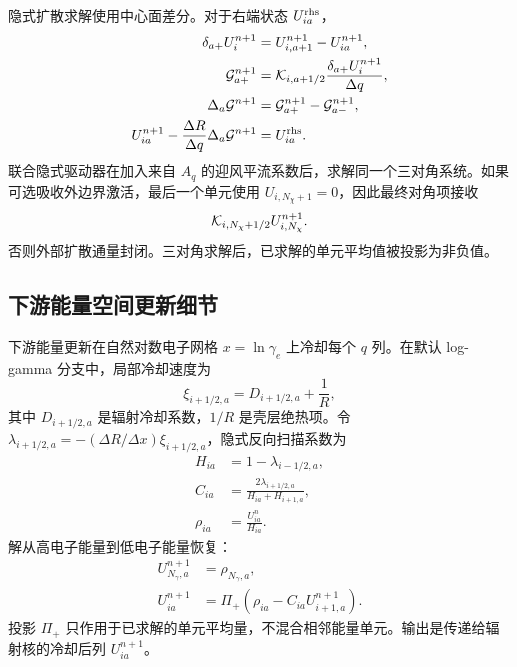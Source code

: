 \documentclass[twocolumn]{aastex702}
\begin{document}
隐式扩散求解使用中心面差分。对于右端状态 \(U_{ia}^{\rm rhs}\)，
\begin{equation}
\begin{aligned}
\delta_{a+}U_i^{n+1}
&=U_{i,a+1}^{n+1}-U_{ia}^{n+1},\\
{\cal G}_{a+}^{n+1}
&={\cal K}_{i,a+1/2}
\frac{\delta_{a+}U_i^{n+1}}{\Delta q},\\
\Delta_a{\cal G}^{n+1}
&={\cal G}_{a+}^{n+1}-{\cal G}_{a-}^{n+1},\\
U_{ia}^{n+1}
-\frac{\Delta R}{\Delta q}\Delta_a{\cal G}^{n+1}
&=U_{ia}^{\rm rhs}.
\end{aligned}
\end{equation}
联合隐式驱动器在加入来自 \(A_q\) 的迎风平流系数后，求解同一个三对角系统。如果可选吸收外边界激活，最后一个单元使用 \(U_{i,N_\chi+1}=0\)，因此最终对角项接收
\begin{equation}
{\cal K}_{i,N_\chi+1/2}U_{i,N_\chi}^{n+1}.
\end{equation}
否则外部扩散通量封闭。三对角求解后，已求解的单元平均值被投影为非负值。

\subsection{下游能量空间更新细节}

下游能量更新在自然对数电子网格 \(x=\ln\gamma_e\) 上冷却每个 \(q\) 列。在默认 log-gamma 分支中，局部冷却速度为
\begin{equation}
\xi_{i+1/2,a}=D_{i+1/2,a}+\frac{1}{R},
\end{equation}
其中 \(D_{i+1/2,a}\) 是辐射冷却系数，\(1/R\) 是壳层绝热项。令 \(\lambda_{i+1/2,a}=-(\Delta R/\Delta x)\xi_{i+1/2,a}\)，隐式反向扫描系数为
\begin{equation}
\begin{aligned}
H_{ia}&=1-\lambda_{i-1/2,a},\\
C_{ia}&=\frac{2\lambda_{i+1/2,a}}{H_{ia}+H_{i+1,a}},\\
\rho_{ia}&=\frac{U_{ia}^{n}}{H_{ia}} .
\end{aligned}
\end{equation}
解从高电子能量到低电子能量恢复：
\begin{equation}
\begin{aligned}
U_{N_\gamma,a}^{n+1}&=\rho_{N_\gamma,a},\\
U_{ia}^{n+1}
&=\Pi_+\!\left(\rho_{ia}-C_{ia}U_{i+1,a}^{n+1}\right).
\end{aligned}
\end{equation}
投影 \(\Pi_+\) 只作用于已求解的单元平均量，不混合相邻能量单元。输出是传递给辐射核的冷却后列 \(U_{ia}^{n+1}\)。
\end{document}
